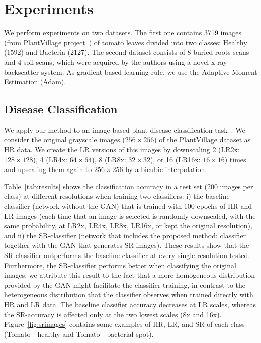 \documentclass[10pt,twocolumn,letterpaper]{article}
\begin{document}
\section{Experiments}
\label{sec:experiments}

We perform experiments on two datasets. The first one contains 3719 images (from PlantVillage project~\cite{Hughes2015}) of tomato leaves divided into two classes: Healthy (1592) and Bacteria (2127). The second dataset consists of 8 buried-roots scans and 4 soil scans, which were acquired by the authors using a novel x-ray backscatter system. As gradient-based learning rule, we use the Adaptive Moment Estimation (Adam).

\subsection{Disease Classification}

We apply our method to an image-based plant disease classification task~\cite{Mohanty2016}. We consider the original grayscale images ($256\times 256$) of the PlantVillage dataset as HR data. We create the LR versions of this images by downscaling 2 (LR2x: $128\times 128$), 4 (LR4x: $64\times 64$), 8 (LR8x: $32\times 32$), or 16 (LR16x: $16\times 16$) times and upscaling them again to $256\times 256$ by a bicubic interpolation.

Table~\ref{tab:results} shows the classification accuracy in a test set (200 images per class) at different resolutions when training two classifiers: i) the baseline classifier (network without the GAN) that is trained with 100 epochs of HR and LR images (each time that an image is selected is randomly downscaled, with the same probability, at LR2x, LR4x, LR8x, LR16x, or kept the original resolution), and ii) the SR-classifier (network that includes the proposed method: classifier together with the GAN that generates SR images). These results show that the SR-classifier outperforms the baseline classifier at every single resolution tested. Furthermore, the SR-classifier performs better when classifying the original images, we attribute this result to the fact that a more homogeneous distribution provided by the GAN might facilitate the classifier training, in contrast to the heterogeneous distribution that the classifier observes when trained directly with HR and LR data. The baseline classifier accuracy decreases at LR scales, whereas the SR-accuracy is affected only at the two lowest scales (8x and 16x). Figure~\ref{fig:srimages} contains some examples of HR, LR, and SR of each class (Tomato - healthy and Tomato - bacterial spot).
\end{document}
